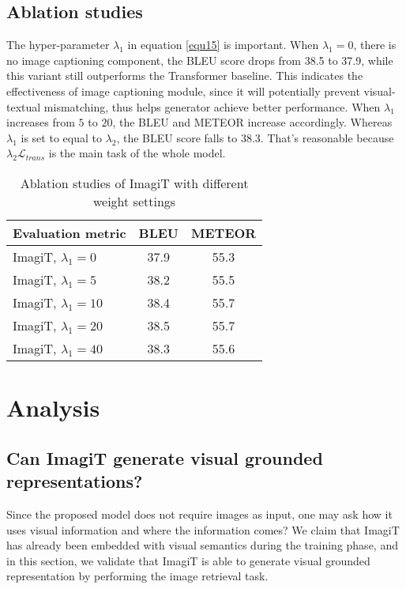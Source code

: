 \documentclass[11pt]{article}
\newcommand{\method}{ImagiT\xspace}
\begin{document}
\subsection{Ablation studies}

The hyper-parameter $\lambda_{1}$ in equation \ref{equ15} is important. When $\lambda_{1}=0$, there is no image captioning component, the BLEU score drops from 38.5 to 37.9, while this variant still outperforms the Transformer baseline. This indicates the effectiveness of image captioning module, since it will potentially prevent visual-textual mismatching, thus helps generator achieve better performance. When $\lambda_{1}$ increases from $5$ to $20$, the BLEU and METEOR increase accordingly. Whereas $\lambda_{1}$ is set to equal to $\lambda_{2}$, the BLEU score falls to 38.3. That's reasonable because $\lambda_{2}\mathcal{L}_{trans}$ is the main task of the whole model.

\begin{table}[h]
\centering
\begin{tabular}{l|cc}
\hline
 Evaluation metric             & BLEU   & METEOR     \\ \hline
 ImagiT, $\lambda_{1}=0$ & 37.9 & 55.3 \\ \hline
  ImagiT, $\lambda_{1}=5$ & 38.2 & 55.5 \\ \hline
   ImagiT, $\lambda_{1}=10$ & 38.4 & 55.7 \\ \hline
    ImagiT, $\lambda_{1}=20$ & 38.5 & 55.7 \\ \hline
     ImagiT, $\lambda_{1}=40$ & 38.3 & 55.6 \\ \hline
\end{tabular}
\caption{Ablation studies of ImagiT with different weight settings}
\label{table2}
\end{table} 
\section{Analysis}
\label{sec:ana}
\subsection{Can \method generate visual grounded representations?}

Since the proposed model does not require images as input, one may ask how it uses visual information and where the information comes? We claim that \method has already been embedded with visual semantics during the training phase, and in this section, we validate that \method is able to generate visual grounded representation by performing the image retrieval task.
\end{document}
